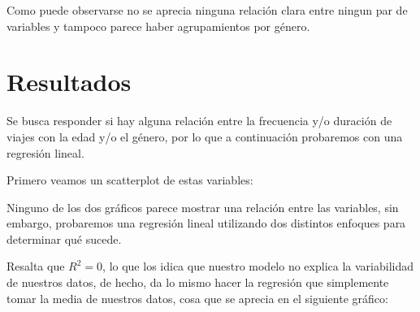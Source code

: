 \documentclass[letterpaper,spanish,reprint,nofootinbib,showkeys,aps]{revtex4-2}
\begin{document}
Como puede observarse no se aprecia ninguna relación clara entre ningun par de variables y
tampoco parece haber agrupamientos por género.



\section{Resultados}

Se busca responder si hay alguna relación entre  la frecuencia y/o duración de viajes con la edad y/o el género, por lo
que a continuación probaremos con una regresión lineal.

Primero veamos un scatterplot de estas variables:


Ninguno de los dos gráficos parece mostrar una relación entre las variables, sin embargo, probaremos una regresión
lineal utilizando dos distintos enfoques para determinar qué sucede.



Resalta que $R^2=0$, lo que los idica que nuestro modelo no explica la variabilidad de nuestros datos, 
de hecho, da lo mismo hacer la regresión que simplemente tomar la media de nuestros datos,
cosa que se aprecia en el siguiente gráfico:
\end{document}
